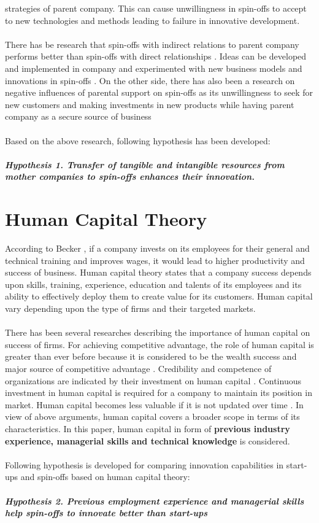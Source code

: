 strategies of parent company. This can cause unwillingness in spin-offs to accept to new
technologies and methods leading to failure in innovative development.
\\
\\
There has be research that spin-offs with indirect relations to parent company performs better
than spin-offs with direct relationships  \cite{35} . Ideas can be developed and implemented in company and
experimented with new business models and innovations in spin-offs \cite{36}. On the other side, there
has also been a research on negative influences of parental support on spin-offs as its unwillingness
to seek for new customers and making investments in new products while having parent company
as a secure source of business \cite{37}
\\
\\
Based on the above research, following hypothesis has been developed:
\\
\\
\textbf{\textit{Hypothesis 1. Transfer of tangible and intangible resources from mother companies to spin-offs enhances their innovation.}}

\section{Human Capital Theory\label{sec:human-based-theory}}
According to Becker \cite{59}, if a company invests on its employees for their general and technical training and improves wages,
it would lead to higher productivity and success of business. Human capital theory states that a company success depends upon skills, training,
experience, education and talents of its employees and its ability to effectively deploy them to
create value for its customers. Human capital vary depending upon the type of firms and their
targeted markets.
\\
\\
There has been several researches describing the importance of human capital on
success of firms. For achieving competitive advantage, the role of human capital is greater than
ever before because it is considered to be the wealth success and major source of competitive
advantage \cite{38}. Credibility and competence of organizations are indicated by their investment on
human capital \cite{39}. Continuous investment in human capital is required for a company to maintain
its position in market. Human capital becomes less valuable if it is not updated over time \cite{40}. In
view of above arguments, human capital covers a broader scope in terms of its characteristics. In this
paper, human capital in form of \textbf{previous industry experience, managerial skills and technical
knowledge} is considered. 
\\
\\
Following hypothesis is developed for comparing innovation capabilities in start-ups
and spin-offs based on human capital theory:
\\
\\
\textbf{\textit{Hypothesis 2. Previous employment experience and managerial skills help spin-offs to
innovate better than start-ups}}

